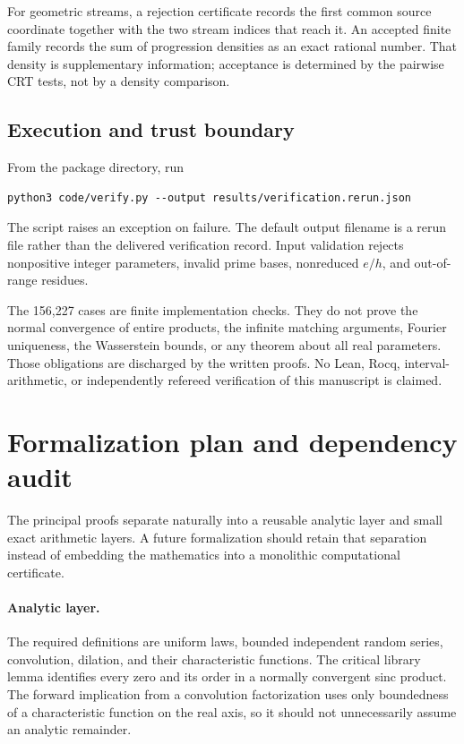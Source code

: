 \documentclass[11pt,letterpaper]{article}
\theoremstyle{definition}
\theoremstyle{remark}
\numberwithin{equation}{section}
\begin{document}
For geometric streams, a rejection certificate records the first common source coordinate together with the two stream indices that reach it. An accepted finite family records the sum of progression densities as an exact rational number. That density is supplementary information; acceptance is determined by the pairwise CRT tests, not by a density comparison.

\subsection{Execution and trust boundary}
From the package directory, run
\begin{verbatim}
python3 code/verify.py --output results/verification.rerun.json
\end{verbatim}
The script raises an exception on failure. The default output filename is a rerun file rather than the delivered verification record. Input validation rejects nonpositive integer parameters, invalid prime bases, nonreduced $e/h$, and out-of-range residues.

The 156,227 cases are finite implementation checks. They do not prove the normal convergence of entire products, the infinite matching arguments, Fourier uniqueness, the Wasserstein bounds, or any theorem about all real parameters. Those obligations are discharged by the written proofs. No Lean, Rocq, interval-arithmetic, or independently refereed verification of this manuscript is claimed.

\section{Formalization plan and dependency audit}\label{sec:formalization}
The principal proofs separate naturally into a reusable analytic layer and small exact arithmetic layers. A future formalization should retain that separation instead of embedding the mathematics into a monolithic computational certificate.

\paragraph{Analytic layer.}
The required definitions are uniform laws, bounded independent random series, convolution, dilation, and their characteristic functions. The critical library lemma identifies every zero and its order in a normally convergent sinc product. The forward implication from a convolution factorization uses only boundedness of a characteristic function on the real axis, so it should not unnecessarily assume an analytic remainder.
\end{document}
